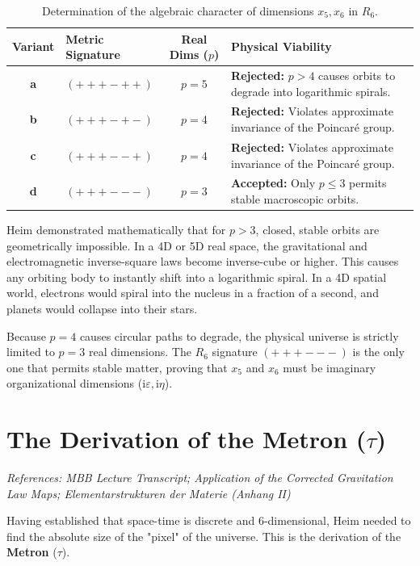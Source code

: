 \documentclass[11pt,a4paper,oneside]{article}
\newcommand{\iu}{\mathrm{i}}              %
\begin{document}
\begin{table}[htbp]
\centering
\renewcommand{\arraystretch}{1.5}
\begin{tabular}{clcl}
\toprule
\textbf{Variant} & \textbf{Metric Signature} & \textbf{Real Dims ($p$)} & \textbf{Physical Viability} \\
\midrule
\rowcolor{theoryblue!5}
\textbf{a} & $(+ + + - + +)$ & $p=5$ & \textbf{Rejected:} $p>4$ causes orbits to degrade into logarithmic spirals.\\
\textbf{b} & $(+ + + - + -)$ & $p=4$ & \textbf{Rejected:} Violates approximate invariance of the Poincaré group.\\
\textbf{c} & $(+ + + - - +)$ & $p=4$ & \textbf{Rejected:} Violates approximate invariance of the Poincaré group.\\
\rowcolor{theorygray!50}
\textbf{d} & $(+ + + - - -)$ & $p=3$ & \textbf{Accepted:} Only $p \le 3$ permits stable macroscopic orbits. \\
\bottomrule
\end{tabular}
\caption{Determination of the algebraic character of dimensions $x_5, x_6$ in $R_6$.}
\end{table}

Heim demonstrated mathematically that for $p > 3$, closed, stable orbits are geometrically impossible. In a 4D or 5D real space, the gravitational and electromagnetic inverse-square laws become inverse-cube or higher. This causes any orbiting body to instantly shift into a logarithmic spiral. In a 4D spatial world, electrons would spiral into the nucleus in a fraction of a second, and planets would collapse into their stars.

Because $p=4$ causes circular paths to degrade, the physical universe is strictly limited to $p=3$ real dimensions. The $R_6$ signature $(+ + + - - -)$ is the only one that permits stable matter, proving that $x_5$ and $x_6$ must be imaginary organizational dimensions ($\iu\varepsilon, \iu\eta$).


\section{The Derivation of the Metron (\texorpdfstring{$\tau$}{tau})}

\textit{References: MBB Lecture Transcript; Application of the Corrected Gravitation Law Maps; Elementarstrukturen der Materie (Anhang II)}

Having established that space-time is discrete and 6-dimensional, Heim needed to find the absolute size of the "pixel" of the universe. This is the derivation of the \textbf{Metron} ($\tau$).
\end{document}

